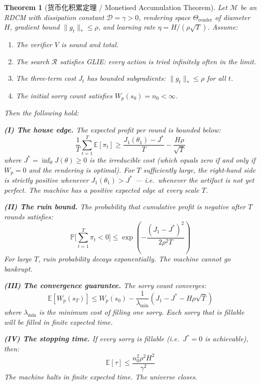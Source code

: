 \documentclass[11pt,a4paper]{article}
\newtheorem{theorem}{Theorem}[section]
\theoremstyle{definition}
\theoremstyle{remark}
\begin{document}
\begin{theorem}[货币化积累定理 / Monetised Accumulation Theorem]\label{thm:casino}
Let $\mathcal{M}$ be an RDCM with dissipation constant $\mathcal{D} = \gamma > 0$, rendering space $\Theta_{\mathrm{render}}$ of diameter $H$, gradient bound $\|g_t\|_* \leq \rho$, and learning rate $\eta = H/(\rho\sqrt{T})$. Assume:
\begin{enumerate}[nosep]
  \item[(A1)] The verifier $V$ is sound and total.
  \item[(A2)] The search $\mathcal{R}$ satisfies GLIE: every action is tried infinitely often in the limit.
  \item[(A3)] The three-term cost $J_t$ has bounded subgradients: $\|g_t\|_* \leq \rho$ for all $t$.
  \item[(A4)] The initial sorry count satisfies $W_p(s_0) = n_0 < \infty$.
\end{enumerate}
Then the following hold:

\textbf{(I) The house edge.} The expected profit per round is bounded below:
\[
  \frac{1}{T} \sum_{t=1}^T \mathbb{E}[\pi_t] \geq \frac{J_1(\theta_1) - J^*}{T} - \frac{H\rho}{\sqrt{T}}
\]
where $J^* = \inf_\theta J(\theta) \geq 0$ is the irreducible cost (which equals zero if and only if $W_p = 0$ and the rendering is optimal). For $T$ sufficiently large, the right-hand side is strictly positive whenever $J_1(\theta_1) > J^*$ --- i.e.\ whenever the artifact is not yet perfect. The machine has a positive expected edge at every scale $T$.

\textbf{(II) The ruin bound.} The probability that cumulative profit is negative after $T$ rounds satisfies:
\[
  \mathbb{P}\Biggl[\sum_{t=1}^T \pi_t < 0 \Biggr] \leq \exp\!\left(-\frac{(J_1 - J^*)^2}{2\rho^2 T}\right)
\]
For large $T$, ruin probability decays exponentially. The machine cannot go bankrupt.

\textbf{(III) The convergence guarantee.} The sorry count converges:
\[
  \mathbb{E}[W_p(s_T)] \leq W_p(s_0) - \frac{1}{\lambda_{\min}} \left( J_1 - J^* - H\rho\sqrt{T} \right)
\]
where $\lambda_{\min}$ is the minimum cost of filling one sorry. Each sorry that is fillable will be filled in finite expected time.

\textbf{(IV) The stopping time.} If every sorry is fillable (i.e.\ $J^* = 0$ is achievable), then:
\[
  \mathbb{E}[\tau] \leq \frac{n_0^2 \rho^2 H^2}{\gamma^2}
\]
The machine halts in finite expected time. The universe closes.
\end{theorem}
\end{document}
